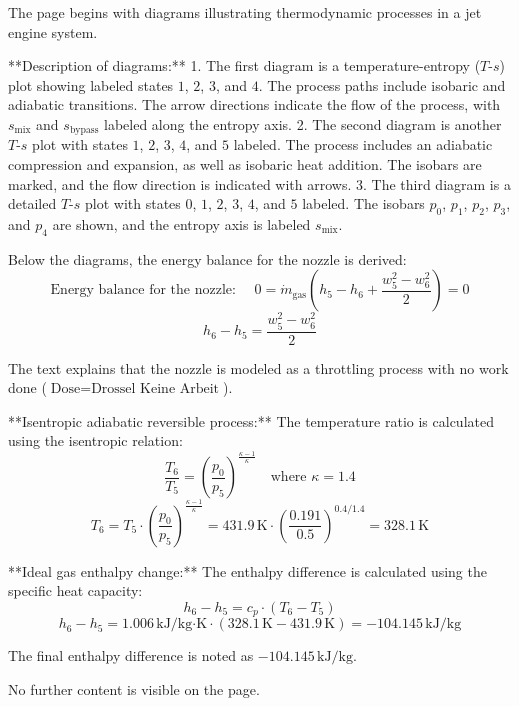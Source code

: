 The page begins with diagrams illustrating thermodynamic processes in a jet engine system.  

**Description of diagrams:**  
1. The first diagram is a temperature-entropy (\( T \)-\( s \)) plot showing labeled states \( 1 \), \( 2 \), \( 3 \), and \( 4 \). The process paths include isobaric and adiabatic transitions. The arrow directions indicate the flow of the process, with \( s_{\text{mix}} \) and \( s_{\text{bypass}} \) labeled along the entropy axis.  
2. The second diagram is another \( T \)-\( s \) plot with states \( 1 \), \( 2 \), \( 3 \), \( 4 \), and \( 5 \) labeled. The process includes an adiabatic compression and expansion, as well as isobaric heat addition. The isobars are marked, and the flow direction is indicated with arrows.  
3. The third diagram is a detailed \( T \)-\( s \) plot with states \( 0 \), \( 1 \), \( 2 \), \( 3 \), \( 4 \), and \( 5 \) labeled. The isobars \( p_0 \), \( p_1 \), \( p_2 \), \( p_3 \), and \( p_4 \) are shown, and the entropy axis is labeled \( s_{\text{mix}} \).  

Below the diagrams, the energy balance for the nozzle is derived:  
\[
\text{Energy balance for the nozzle: } \quad 0 = \dot{m}_{\text{gas}} \left( h_5 - h_6 + \frac{w_5^2 - w_6^2}{2} \right) = 0
\]
\[
h_6 - h_5 = \frac{w_5^2 - w_6^2}{2}
\]

The text explains that the nozzle is modeled as a throttling process with no work done (\( \text{Dose} = \text{Drossel Keine Arbeit} \)).  

**Isentropic adiabatic reversible process:**  
The temperature ratio is calculated using the isentropic relation:  
\[
\frac{T_6}{T_5} = \left( \frac{p_0}{p_5} \right)^{\frac{\kappa - 1}{\kappa}} \quad \text{where } \kappa = 1.4
\]
\[
T_6 = T_5 \cdot \left( \frac{p_0}{p_5} \right)^{\frac{\kappa - 1}{\kappa}} = 431.9 \, \text{K} \cdot \left( \frac{0.191}{0.5} \right)^{0.4/1.4} = 328.1 \, \text{K}
\]

**Ideal gas enthalpy change:**  
The enthalpy difference is calculated using the specific heat capacity:  
\[
h_6 - h_5 = c_p \cdot \left( T_6 - T_5 \right)
\]
\[
h_6 - h_5 = 1.006 \, \text{kJ/kg·K} \cdot \left( 328.1 \, \text{K} - 431.9 \, \text{K} \right) = -104.145 \, \text{kJ/kg}
\]

The final enthalpy difference is noted as \( -104.145 \, \text{kJ/kg} \).  

No further content is visible on the page.